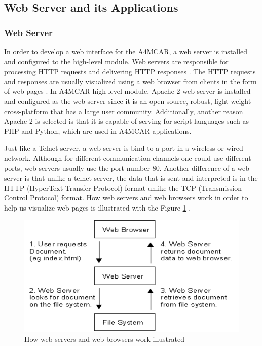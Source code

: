 \subsection{Web Server and its Applications}
\subsubsection{Web Server}
In order to develop a web interface for the A4MCAR, a web server is installed and configured to the high-level module. Web servers are responsible for processing HTTP requests and delivering HTTP responses \cite{apacheguide}. The HTTP requests and responses are usually visualized using a web browser from clients in the form of web pages \cite{apacheguide}. In A4MCAR high-level module, Apache 2 web server is installed and configured as the web server since it is an open-source, robust, light-weight cross-platform that has a large user community. Additionally, another reason Apache 2 is selected is that it is capable of serving for script languages such as PHP and Python, which are used in A4MCAR applications.

Just like a Telnet server, a web server is bind to a port in a wireless or wired network. Although for different communication channels one could use different ports, web servers usually use the port number 80. Another difference of a web server is that unlike a telnet server, the data that is sent and interpreted is in the HTTP (HyperText Transfer Protocol) \cite{webserver} format unlike the TCP (Transmission Control Protocol) format. How web servers and web browsers work in order to help us visualize web pages is illustrated with the Figure \ref{fig:webserver} \cite{webserver}. \\

\begin{figure}[!ht]
	\centering
	\captionsetup{justification=centering}
	\includegraphics[scale=0.5]{content/images/webserver.png}
	\caption{How web servers and web browsers work illustrated \cite{webserver}}
	\label{fig:webserver}
\end{figure}


